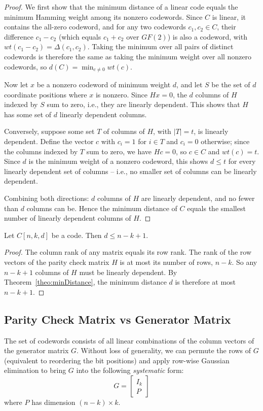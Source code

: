 \begin{proof}
We first show that the minimum distance of a linear code equals the minimum Hamming weight among its nonzero codewords. Since \(C\) is linear, it contains the all-zero codeword, and for any two codewords \(c_1, c_2 \in C\), their difference \(c_1 - c_2\) (which equals \(c_1+c_2\) over \(GF(2)\)) is also a codeword, with \(wt(c_1-c_2) = \Delta(c_1,c_2)\). Taking the minimum over all pairs of distinct codewords is therefore the same as taking the minimum weight over all nonzero codewords, so \(d(C) = \min_{c \neq 0} wt(c)\).

Now let \(x\) be a nonzero codeword of minimum weight \(d\), and let \(S\) be the set of \(d\) coordinate positions where \(x\) is nonzero. Since \(Hx=0\), the \(d\) columns of \(H\) indexed by \(S\) sum to zero, i.e., they are linearly dependent. This shows that \(H\) has some set of \(d\) linearly dependent columns.

Conversely, suppose some set \(T\) of columns of \(H\), with \(|T|=t\), is linearly dependent. Define the vector \(c\) with \(c_i=1\) for \(i \in T\) and \(c_i = 0\) otherwise; since the columns indexed by \(T\) sum to zero, we have \(Hc=0\), so \(c \in C\) and \(wt(c) = t\). Since \(d\) is the minimum weight of a nonzero codeword, this shows \(d \leq t\) for every linearly dependent set of columns -- i.e., no smaller set of columns can be linearly dependent.

Combining both directions: \(d\) columns of \(H\) are linearly dependent, and no fewer than \(d\) columns can be. Hence the minimum distance of \(C\) equals the smallest number of linearly dependent columns of \(H\).
\end{proof}

\begin{proposition}
    Let \(C[n,k,d]\) be a code. Then \(d \leq n-k+1\).
\end{proposition}
\begin{proof}
The column rank of any matrix equals its row rank. The rank of the row vectors of the parity check matrix \(H\) is at most its number of rows, \(n-k\). So any \(n-k+1\) columns of \(H\) must be linearly dependent. By Theorem~\ref{theo:minDistance}, the minimum distance \(d\) is therefore at most \(n-k+1\).
\end{proof}
    

\subsection{Parity Check Matrix vs Generator Matrix}
The set of codewords consists of all linear combinations of the column vectors of the generator matrix \(G\). Without loss of generality, we can permute the rows of \(G\) (equivalent to reordering the bit positions) and apply row-wise Gaussian elimination to bring \(G\) into the following \emph{systematic} form: 
$$G = \begin{bmatrix}
    I_{k} \\
    P
    \end{bmatrix}
$$
where \(P\) has dimension \((n-k) \times k\). 

